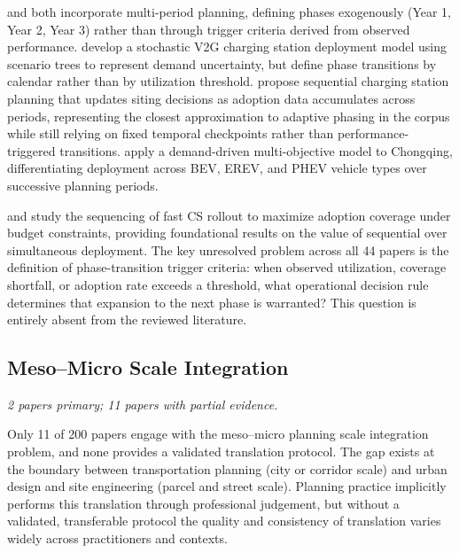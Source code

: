 \documentclass[12pt,letterpaper]{article}
\begin{document}
\citet{najafzad2026} and \citet{yu2025} both incorporate multi-period
planning, defining phases exogenously (Year 1, Year 2, Year 3) rather
than through trigger criteria derived from observed performance.
\citet{tang2025} develop a stochastic V2G charging station deployment
model using scenario trees to represent demand uncertainty, but define
phase transitions by calendar rather than by utilization threshold.
\citet{shen2024} propose sequential charging station planning that
updates siting decisions as adoption data accumulates across periods,
representing the closest approximation to adaptive phasing in the corpus
while still relying on fixed temporal checkpoints rather than
performance-triggered transitions.  \citet{yuan2025b} apply a
demand-driven multi-objective model to Chongqing, differentiating
deployment across BEV, EREV, and PHEV vehicle types over successive
planning periods.

\citet{guillet2020} and \citet{anjos2020} study the sequencing of fast
CS rollout to maximize adoption coverage under budget constraints,
providing foundational results on the value of sequential over
simultaneous deployment.  The key unresolved problem across all 44
papers is the definition of phase-transition trigger criteria: when
observed utilization, coverage shortfall, or adoption rate exceeds a
threshold, what operational decision rule determines that expansion to
the next phase is warranted?  This question is entirely absent from the
reviewed literature.

\subsection{Meso--Micro Scale Integration}

\textit{2 papers primary; 11 papers with partial evidence.}

Only 11 of 200 papers engage with the meso--micro planning scale
integration problem, and none provides a validated translation protocol.
The gap exists at the boundary between transportation planning
(city or corridor scale) and urban design and site engineering (parcel
and street scale).  Planning practice implicitly performs this
translation through professional judgement, but without a validated,
transferable protocol the quality and consistency of translation varies
widely across practitioners and contexts.
\end{document}
